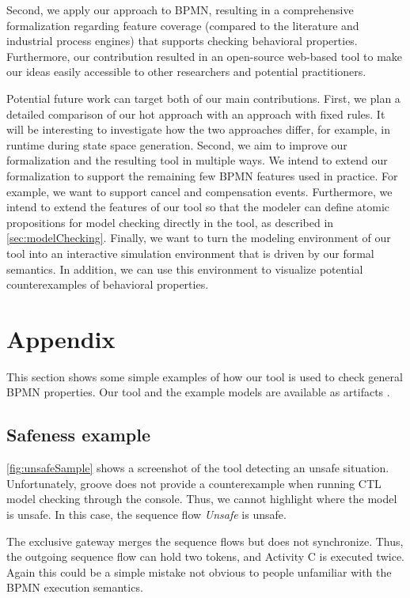 \documentclass[runningheads]{llncs}
\begin{document}
Second, we apply our approach to BPMN, resulting in a comprehensive formalization regarding feature coverage (compared to the literature and industrial process engines) that supports checking behavioral properties.
Furthermore, our contribution resulted in an open-source web-based tool to make our ideas easily accessible to other researchers and potential practitioners.

Potential future work can target both of our main contributions.
First, we plan a detailed comparison of our \gls*{hot} approach with an approach with fixed rules.
It will be interesting to investigate how the two approaches differ, for example, in runtime during state space generation.
Second, we aim to improve our formalization and the resulting tool in multiple ways.
We intend to extend our formalization to support the remaining few BPMN features used in practice.
For example, we want to support cancel and compensation events.
Furthermore, we intend to extend the features of our tool so that the modeler can define atomic propositions for model checking directly in the tool, as described in \autoref{sec:modelChecking}.
Finally, we want to turn the modeling environment of our tool into an interactive simulation environment that is driven by our formal semantics.
In addition, we can use this environment to visualize potential counterexamples of behavioral properties.

 


\section{Appendix}


This section shows some simple examples of how our tool is used to check general BPMN properties.
Our tool and the example models are available as artifacts \cite{krauterArtifactsICGT2023}.

\subsection{Safeness example}
\autoref{fig:unsafeSample} shows a screenshot of the tool detecting an unsafe situation.
Unfortunately, groove does not provide a counterexample when running CTL model checking through the console.
Thus, we cannot highlight where the model is unsafe.
In this case, the sequence flow \textit{Unsafe} is unsafe.

The exclusive gateway merges the sequence flows but does not synchronize.
Thus, the outgoing sequence flow can hold two tokens, and Activity C is executed twice.
Again this could be a simple mistake not obvious to people unfamiliar with the BPMN execution semantics.
\end{document}
